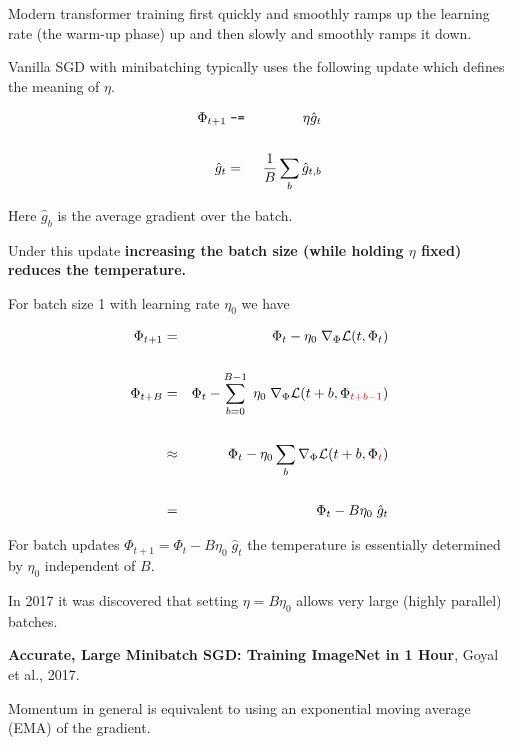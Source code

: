 {\vfill
Modern transformer training first quickly and smoothly ramps up the learning rate (the warm-up phase) up and then slowly and smoothly ramps it down.


Vanilla SGD with minibatching typically uses the following update which defines the meaning of $\eta$.

\begin{eqnarray*}
\Phi_{t+1} & \;\mbox{\tt -=}\; & \eta \hat{g}_t \\
\\
\hat{g}_t & = & \frac{1}{B} \sum_b \hat{g}_{t,b}
\end{eqnarray*}

\vfill
Here $\hat{g}_{b}$ is the average gradient over the batch.

\vfill
Under this update {\bf increasing the batch size (while holding $\eta$ fixed) reduces the temperature.}


For batch size 1 with learning rate $\eta_0$ we have

\begin{eqnarray*}
\Phi_{t+1} & = &  \Phi_{t} - \eta_0\;\nabla_\Phi {\cal L}(t,\Phi_{t}) \\
\\
\Phi_{t+B} & = &  \Phi_{t} - \sum_{b=0}^{B-1} \;\eta_0\;\nabla_\Phi {\cal L}(t+b,\Phi_{\color{red} t+b-1}) \\
\\
& \approx & \Phi_t - \eta_0 \sum_b \nabla_\Phi {\cal L}(t+b,\Phi_{\color{red} t}) \\
\\
& = & \Phi_t - B\eta_0\; \hat{g}_t
\end{eqnarray*}

\vfill
For batch updates $\Phi_{t+1} = \Phi_t - B\eta_0\; \hat{g}_t$ the temperature is essentially determined by $\eta_0$ independent of $B$.


In 2017 it was discovered that setting $\eta = B\eta_0$ allows very large (highly parallel)
batches.

\vfill
{\bf Accurate, Large Minibatch SGD: Training ImageNet in 1 Hour}, Goyal et al., 2017.




Momentum in general is equivalent to using an exponential moving average (EMA) of the gradient.

}
